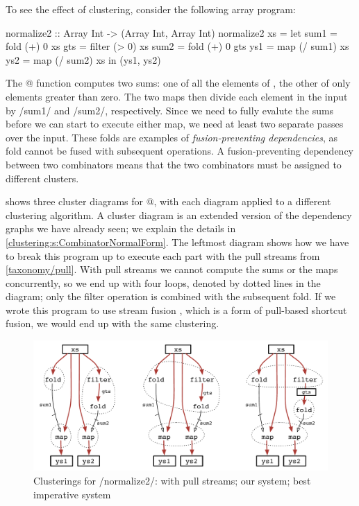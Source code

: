 To see the effect of clustering, consider the following array program:

\begin{haskell}
normalize2 :: Array Int -> (Array Int, Array Int)
normalize2 xs
 = let sum1 = fold   (+)  0   xs
       gts  = filter (>   0)  xs
       sum2 = fold   (+)  0   gts
       ys1  = map    (/ sum1) xs
       ys2  = map    (/ sum2) xs
   in (ys1, ys2)
\end{haskell}

The @ function computes two sums: one of all the elements of \Hs@xs@, the other of only elements greater than zero.
The two maps then divide each element in the input \Hs@xs@ by \Hs/sum1/ and \Hs/sum2/, respectively.
Since we need to fully evalute the sums before we can start to execute either map, we need at least two separate passes over the input.
These folds are examples of \emph{fusion-preventing dependencies}, as fold cannot be fused with subsequent operations.
A fusion-preventing dependency between two combinators means that the two combinators must be assigned to different clusters.

 shows three cluster diagrams for @, with each diagram applied to a different clustering algorithm.
A cluster diagram is an extended version of the dependency graphs we have already seen; we explain the details in \cref{clustering:s:CombinatorNormalForm}.
The leftmost diagram shows how we have to break this program up to execute each part with the pull streams from \cref{taxonomy/pull}.
With pull streams we cannot compute the sums or the maps concurrently, so we end up with four loops, denoted by dotted lines in the diagram; only the filter operation is combined with the subsequent fold.
If we wrote this program to use stream fusion \citep{coutts2007stream}, which is a form of pull-based shortcut fusion, we would end up with the same clustering.

\begin{figure}
\begin{center}
\includegraphics[scale=0.5]{copy/03-body/clustering/figures/ex1-compare.pdf}
\end{center}
\caption{Clusterings for \Hs/normalize2/: with pull streams; our system; best imperative system}
\label{clustering:f:normalize2-clusterings}
\end{figure}


